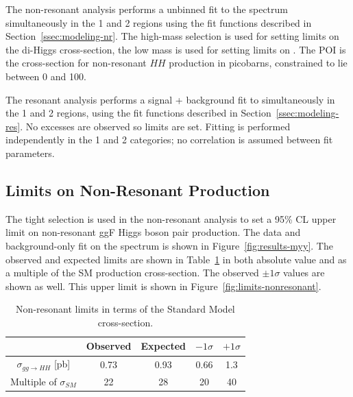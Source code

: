 The non-resonant analysis performs a unbinned fit to the \myy spectrum simultaneously in the 1 and 2 \btag regions using the fit functions described in Section~\ref{ssec:modeling-nr}. The high-mass selection is used for setting limits on the di-Higgs cross-section, the low mass is used for setting limits on \klambda. The \gls{POI} is the cross-section for non-resonant $HH$ production in picobarns, constrained to lie between 0 and 100. 

The resonant analysis performs a signal + background fit to \myybb simultaneously in the 1 and 2 \btag regions, using the fit functions described in Section~\ref{ssec:modeling-res}. No excesses are observed so limits are set. Fitting is performed independently in the 1 and 2 \btag categories; no correlation is assumed between fit parameters.

\subsection{Limits on Non-Resonant Production}

The tight selection is used in the non-resonant analysis to set a 95\% \gls{CL} upper limit on non-resonant \gls{ggF} Higgs boson pair production. The data and background-only fit on the \myy spectrum is shown in Figure~\ref{fig:results-myy}. The observed and expected limits are shown in Table~\ref{tab:nonresonant_results_SM} in both absolute value and as a multiple of the \gls{SM} production cross-section. The observed $\pm 1\sigma$ values are shown as well. This upper limit is shown in Figure~\ref{fig:limits-nonresonant}.

\begin{table}[!htbp]
  \centering 
  \caption{Non-resonant limits in terms of the Standard Model \HH cross-section.}
  \label{tab:nonresonant_results_SM} 

  \begin{tabular}{ccccc}
  \hline
  & Observed & Expected & $-1\sigma$  & $+1\sigma$ \\
  \hline
  $\sigma_{gg\rightarrow HH}$ [pb] & 0.73 & 0.93 & 0.66 & 1.3\\
  Multiple of $\sigma_{SM}$ & 22 & 28 & 20 & 40 \\
  \hline
  \end{tabular}
\end{table}

